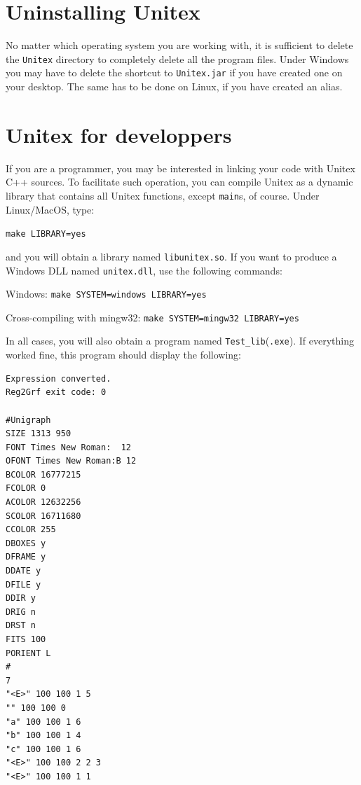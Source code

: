 \section{Uninstalling Unitex}
No matter which operating system you are working with, it is sufficient to delete 
the \verb+Unitex+ directory to completely delete all the program files. Under
Windows you may have to delete the shortcut to \verb+Unitex.jar+  
if you have created one on your desktop. The same has to be done on Linux, if you have 
created an alias.


\section{Unitex for developpers}
\label{section-unitex-developpers}
If you are a programmer, you may be interested in linking your code with Unitex
C++ sources. To facilitate such operation, you can compile Unitex as a
dynamic library that contains all Unitex functions, except \verb+main+s, of
course. Under Linux/MacOS, type:

\bigskip
\verb+make LIBRARY=yes+

\bigskip
\noindent and you will obtain a library named \verb+libunitex.so+. If you want
to produce a Windows DLL named \verb+unitex.dll+, use the following commands:

\bigskip
Windows: \verb+make SYSTEM=windows LIBRARY=yes+

Cross-compiling with mingw32: \verb+make SYSTEM=mingw32 LIBRARY=yes+

\bigskip
\noindent In all cases, you will also obtain a program named
\verb+Test_lib+(\verb+.exe+). If everything worked fine, this program should 
display the following:

\begin{verbatim}
Expression converted.
Reg2Grf exit code: 0

#Unigraph
SIZE 1313 950
FONT Times New Roman:  12
OFONT Times New Roman:B 12
BCOLOR 16777215
FCOLOR 0
ACOLOR 12632256
SCOLOR 16711680
CCOLOR 255
DBOXES y
DFRAME y
DDATE y
DFILE y
DDIR y
DRIG n
DRST n
FITS 100
PORIENT L
#
7
"<E>" 100 100 1 5
"" 100 100 0
"a" 100 100 1 6
"b" 100 100 1 4
"c" 100 100 1 6
"<E>" 100 100 2 2 3
"<E>" 100 100 1 1
\end{verbatim}
